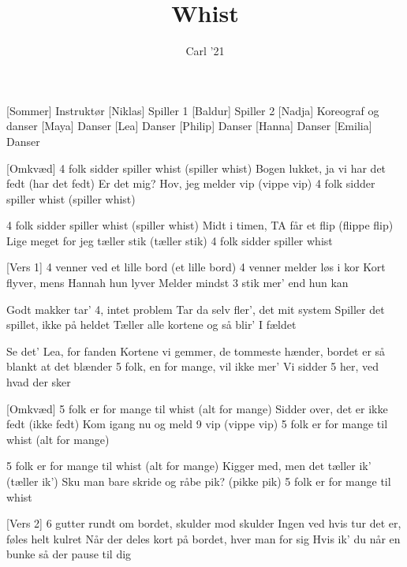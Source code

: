 \documentclass[a4paper,11pt]{article}
\title{Whist}
\author{Carl '21}
\begin{document}
\maketitle

\begin{roles}
[Sommer] Instruktør
[Niklas] Spiller 1
[Baldur] Spiller 2
[Nadja] Koreograf og danser
[Maya] Danser
[Lea] Danser
[Philip] Danser
[Hanna] Danser
[Emilia] Danser
\end{roles}

\begin{song}

[Omkvæd] 4 folk sidder spiller whist (spiller whist) 
    Bogen lukket, ja vi har det fedt (har det fedt)
    Er det mig? Hov, jeg melder vip (vippe vip)
    4 folk sidder spiller whist (spiller whist)

 4 folk sidder spiller whist (spiller whist) 
    Midt i timen, TA får et flip (flippe flip)
    Lige meget for jeg tæller stik (tæller stik)
    4 folk sidder spiller whist 

[Vers 1] 4 venner ved et lille bord (et lille bord)
    4 venner melder løs i kor
    Kort flyver, mens Hannah hun lyver
    Melder mindst 3 stik mer' end hun kan

 Godt makker tar' 4, intet problem
    Tar da selv fler', det mit system
    Spiller det spillet, ikke på heldet
    Tæller alle kortene og så blir' I fældet


 Se det' Lea, for fanden
    Kortene vi gemmer, de tommeste hænder, bordet er så blankt at det blænder
    5 folk, en for mange, vil ikke mer'
    Vi sidder 5 her, ved hvad der sker

[Omkvæd] 5 folk er for mange til whist (alt for mange)
    Sidder over, det er ikke fedt (ikke fedt)
    Kom igang nu og meld 9 vip (vippe vip)
    5 folk er for mange til whist (alt for mange)

 5 folk er for mange til whist (alt for mange)
    Kigger med, men det tæller ik' (tæller ik')
    Sku man bare skride og råbe pik? (pikke pik)
    5 folk er for mange til whist


[Vers 2] 6 gutter rundt om bordet, skulder mod skulder
    Ingen ved hvis tur det er, føles helt kulret
    Når der deles kort på bordet, hver man for sig
    Hvis ik' du når en bunke så der pause til dig


\end{song}
\end{document}
